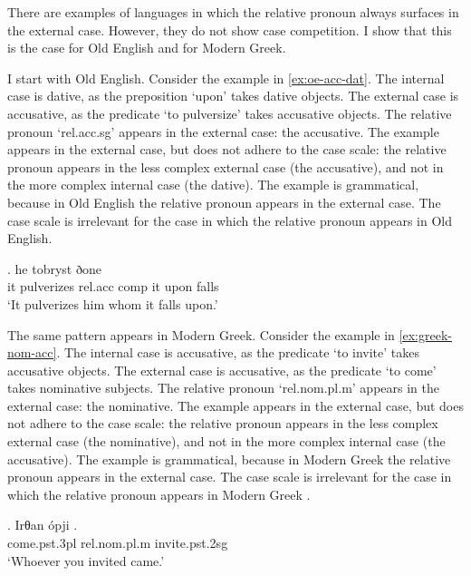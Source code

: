 There are examples of languages in which the relative pronoun always surfaces in the external case. However, they do not show case competition.
I show that this is the case for Old English and for Modern Greek.

I start with Old English.
Consider the example in \ref{ex:oe-acc-dat}.
The internal case is dative, as the preposition  `upon' takes dative objects.
The external case is accusative, as the predicate  `to pulversize' takes accusative objects.
The relative pronoun  `\ac{rel}.\ac{acc}.\ac{sg}' appears in the external case: the accusative.
The example appears in the external case, but does not adhere to the case scale: the relative pronoun appears in the less complex external  case (the accusative), and not in the more complex internal case (the dative).
The example is grammatical, because in Old English the relative pronoun appears in the external case. The case scale is irrelevant for the case in which the relative pronoun appears in Old English.

\exg. he tobryst ðone    \\
 it pulverizes\scsub{[acc]} \ac{rel}.\ac{acc} \ac{comp} it upon\scsub{[dat]} falls\\
`It pulverizes him whom it falls upon.'  \label{ex:oe-acc-dat}

The same pattern appears in Modern Greek.
Consider the example in \ref{ex:greek-nom-acc}.
The internal case is accusative, as the predicate  `to invite' takes accusative objects.
The external case is accusative, as the predicate  `to come' takes nominative subjects.
The relative pronoun  `\ac{rel}.\ac{nom}.\ac{pl}.\ac{m}' appears in the external case: the nominative.
The example appears in the external case, but does not adhere to the case scale: the relative pronoun appears in the less complex external  case (the nominative), and not in the more complex internal case (the accusative).
The example is grammatical, because in Modern Greek the relative pronoun appears in the external case. The case scale is irrelevant for the case in which the relative pronoun appears in Modern Greek .

\exg. Irθan ópji .\\
come.\ac{pst}.3\ac{pl} \ac{rel}.\ac{nom}.\ac{pl}.\ac{m} invite.\ac{pst}.2\ac{sg}\\
`Whoever you invited came.'\label{ex:greek-nom-acc}

